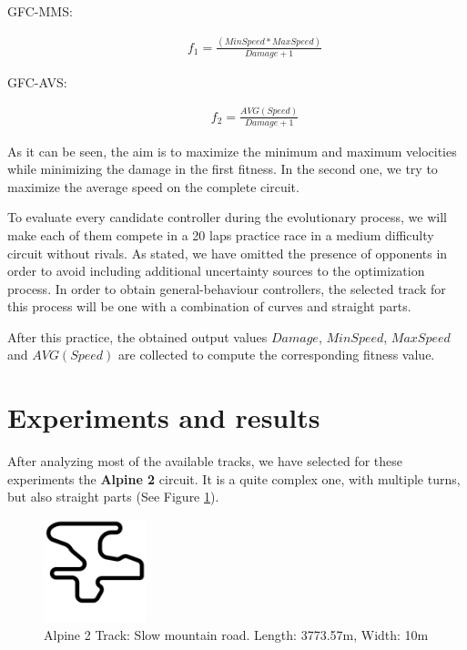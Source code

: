 \documentclass[conference]{IEEEtran}
\begin{document}
\begin{description}
	\item[GFC-MMS:]  
	\begin{equation} \label{fit1}
	\begin{array}{ll}
	f_{1} =   \frac{(MinSpeed*MaxSpeed) }{Damage+1}
	\end{array}
	\end{equation}
	\item[GFC-AVS:] 
	\begin{equation} \label{fit2}
	\begin{array}{lll}
	f_{2}= \frac{AVG(Speed)}{Damage+1}
	\end{array}
	\end{equation}	
\end{description} 

As it can be seen, the aim is to maximize the minimum and maximum velocities while minimizing the damage in the first fitness. In the second one, we try to maximize the average speed on the complete circuit.

To evaluate every candidate controller during the evolutionary process, we will make each of them compete in a 20 laps practice race in a medium difficulty circuit without rivals. As stated, we have omitted the presence of opponents in order to avoid including additional uncertainty sources to the optimization process. In order to obtain general-behaviour controllers, the selected track for this process will be one with a combination of curves and straight parts.

After this practice, the obtained output values $Damage$, $MinSpeed$, $MaxSpeed$ and $AVG(Speed)$ are collected to compute the corresponding fitness value.



\section{Experiments and results}  
\label{sec:results}

After analyzing most of the available tracks, we have selected for these experiments the \textbf{Alpine 2} circuit. It is a quite complex one, with multiple turns, but also straight parts (See Figure \ref{fig:alpine2_track}).

\begin{figure}[!ht]	
  \begin{center}
    \includegraphics[width=3cm]{fig/alpine2.jpg}
    \caption{Alpine 2 Track: Slow mountain road. Length: 3773.57m, Width: 10m}
    \label{fig:alpine2_track}	
  \end{center}	
\end{figure}
\end{document}
